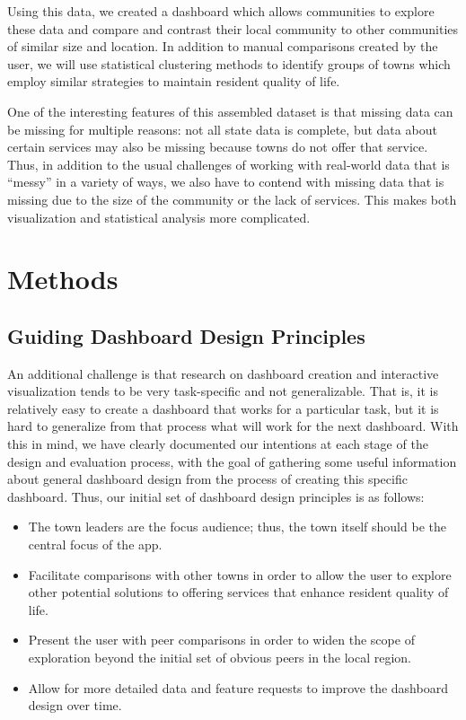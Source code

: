 \documentclass[letterpaper,inpress]{jdsart}
\begin{document}
Using this data, we created a dashboard which allows communities to explore these data and compare and contrast their local community to other communities of similar size and location. In addition to manual comparisons created by the user, we will use statistical clustering methods to identify groups of towns which employ similar strategies to maintain resident quality of life.

One of the interesting features of this assembled dataset is that missing data can be missing for multiple reasons: not all state data is complete, but data about certain services may also be missing because towns do not offer that service.
Thus, in addition to the usual challenges of working with real-world data that is ``messy'' in a variety of ways, we also have to contend with missing data that is missing due to the size of the community or the lack of services. This makes both visualization and statistical analysis more complicated.

\hypertarget{methods}{%
\section{Methods}\label{methods}}

\subsection{Guiding Dashboard Design Principles}

An additional challenge is that research on dashboard creation and interactive visualization tends to be very task-specific and not generalizable. That is, it is relatively easy to create a dashboard that works for a particular task, but it is hard to generalize from that process what will work for the next dashboard. With this in mind, we have clearly documented our intentions at each stage of the design and evaluation process, with the goal of gathering some useful information about general dashboard design from the process of creating this specific dashboard.
Thus, our initial set of dashboard design principles is as follows:

\begin{itemize}
\item The town leaders are the focus audience; thus, the town itself should be the central focus of the app.
\item Facilitate comparisons with other towns in order to allow the user to explore other potential solutions to offering services that enhance resident quality of life.
\item Present the user with peer comparisons in order to widen the scope of exploration beyond the initial set of obvious peers in the local region.
\item Allow for more detailed data and feature requests to improve the dashboard design over time.
\end{itemize}
\end{document}
